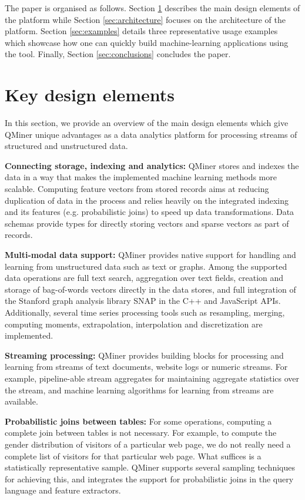 \documentclass{article} %
\begin{document}
The paper is organised as follows. Section \ref{sec:design} describes the main design elements of the platform while Section \ref{sec:architecture} focuses on the architecture of the platform. Section \ref{sec:examples} details three representative usage examples which showcase how one can quickly build machine-learning applications using the tool. Finally, Section \ref{sec:conclusions} concludes the paper.

\section{Key design elements}
\label{sec:design}

In this section, we provide an overview of the main design elements which give QMiner unique advantages as a data analytics platform for processing streams of structured and unstructured data.

\textbf{Connecting storage, indexing and analytics:} QMiner stores and indexes the data in a way that makes the implemented machine learning methods more scalable. Computing feature vectors from stored records aims at reducing duplication of data in the process and relies heavily on the integrated indexing and its features (e.g. probabilistic joins) to speed up data transformations. Data schemas provide types for directly storing vectors and sparse vectors as part of records.

\textbf{Multi-modal data support:} QMiner provides native support for handling and learning from unstructured data such as text or graphs. Among the supported data operations are full text search, aggregation over text fields, creation and storage of bag-of-words vectors directly in the data stores, and full integration of the Stanford graph analysis library SNAP \cite{snap} in the C++ and JavaScript APIs. Additionally, several time series processing tools such as resampling, merging, computing moments, extrapolation, interpolation and discretization are implemented.

\textbf{Streaming processing:} QMiner provides building blocks for processing and learning from streams of text documents, website logs or numeric streams. For example, pipeline-able stream aggregates for maintaining aggregate statistics over the stream, and machine learning algorithms for learning from streams are available.

\textbf{Probabilistic joins between tables:} For some operations, computing a complete join between tables is not necessary. For example, to compute the gender distribution of visitors of a particular web page, we do not really need a complete list of visitors for that particular web page. What suffices is a statistically representative sample. QMiner supports several sampling techniques for achieving this, and integrates the support for probabilistic joins in the query language and feature extractors.
\end{document}
